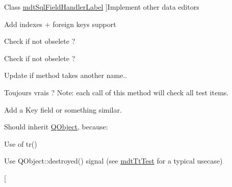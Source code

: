 \begin{DoxyRefList}
Class \hyperlink{classmdt_sql_field_handler_label}{mdt\-Sql\-Field\-Handler\-Label} ]Implement other data editors  
\item[\label{todo__todo000007}%
\hypertarget{todo__todo000007}{}%
Member \hyperlink{classmdt_sql_schema_table_a2cea444ccb26b0802fb230db5460e167}{mdt\-Sql\-Schema\-Table\-:\-:setup\-From\-Table} (const Q\-String \&name, Q\-Sql\-Database db)]Add indexes + foreign keys support  
\item[\label{todo__todo000107}%
\hypertarget{todo__todo000107}{}%
Class \hyperlink{classmdt_sql_table_model}{mdt\-Sql\-Table\-Model} ]Check if not obselete ?  
\item[\label{todo__todo000106}%
\hypertarget{todo__todo000106}{}%
Member \hyperlink{classmdt_sql_table_model_ad423c1b0c74ecbbb575637b028c2574b}{mdt\-Sql\-Table\-Model\-:\-:mdt\-Sql\-Table\-Model} (\hyperlink{class_q_object}{Q\-Object} $\ast$parent=0, Q\-Sql\-Database db=Q\-Sql\-Database())]Check if not obselete ?  
\item[\label{todo__todo000061}%
\hypertarget{todo__todo000061}{}%
Member \hyperlink{classmdt_tt_abstract_tester_a9cc3f5bfe9e27ac0ae376ea1c82e8585}{mdt\-Tt\-Abstract\-Tester\-:\-:set\-Test\-Ui\-Widget} (\hyperlink{class_q_widget}{Q\-Widget} $\ast$widget)]Update if method takes another name.. 
\item[\label{todo__todo000062}%
\hypertarget{todo__todo000062}{}%
Member \hyperlink{classmdt_tt_abstract_tester_af98bb9d80bfbd14873fc356c17d31eb4}{mdt\-Tt\-Abstract\-Tester\-:\-:test\-Is\-Saved} () const ]Toujours vrais ? Note\-: each call of this method will check all test items.  
\item[\label{todo__todo000063}%
\hypertarget{todo__todo000063}{}%
Member \hyperlink{classmdt_tt_abstract_test_node_calibration_tool_a85c47fe2b501769f5966a27aeb3f051a}{mdt\-Tt\-Abstract\-Test\-Node\-Calibration\-Tool\-:\-:set\-Test\-Node} (const Q\-Variant \&test\-Node\-Id)]Add a Key field or something similar.  
\item[\label{todo__todo000065}%
\hypertarget{todo__todo000065}{}%
Class \hyperlink{classmdt_tt_base}{mdt\-Tt\-Base} ]Should inherit \hyperlink{class_q_object}{Q\-Object}, because\-:
\begin{DoxyItemize}
\item Use of tr()
\item Use Q\-Object\-::destroyed() signal (see \hyperlink{classmdt_tt_test}{mdt\-Tt\-Test} for a typical usecase)  
\end{DoxyItemize}
\item[\label{todo__todo000064}%

\end{DoxyRefList}
